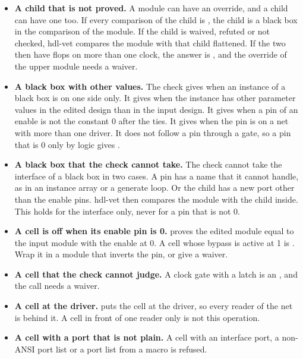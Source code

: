 \begin{itemize}
  its load value to its output while the load is active. If the load value depends on the
  output of the same flop, the loop check reports a loop. It does not ask whether the load
  can be active. Such a module gives  for every edit.
\item \textbf{A child that is not proved.} A module can have an override, and a child can
  have one too. If every comparison of the child is , the child is a black box
  in the comparison of the module. If the child is waived, refuted or not checked, hdl-vet
  compares the module with that child flattened. If the two then have flops on more than one
  clock, the answer is , and the override of the upper module needs a waiver.
\item \textbf{A black box with other values.} The check gives  when an
  instance of a black box is on one side only. It gives  when the instance has
  other parameter values in the edited design than in the input design. It gives
   when a pin of an enable is not the constant 0 after the ties. It gives
   when the pin is on a net with more than one driver. It does not follow a pin
  through a gate, so a pin that is 0 only by logic gives .
\item \textbf{A black box that the check cannot take.} The check cannot take the interface
  of a black box in two cases. A pin has a name that it cannot handle, as in an instance
  array or a generate loop. Or the child has a new port other than the enable pins. hdl-vet then
  compares the module with the child inside. This holds for the interface only, never for a
  pin that is not 0.
\item \textbf{A cell is off when its enable pin is 0.} 
  proves the edited module equal to the input module with the enable at 0. A cell whose
  bypass is active at 1 is . Wrap it in a module that inverts the pin, or
  give a waiver.
\item \textbf{A cell that the check cannot judge.} A clock gate with a latch is an
  , and the call needs a waiver.
\item \textbf{A cell at the driver.}  puts the cell at
  the driver, so every reader of the net is behind it. A cell in front of one reader only
  is not this operation.
\item \textbf{A cell with a port that is not plain.} A cell with an interface port, a
  non-ANSI port list or a port list from a macro is refused.

\end{itemize}
